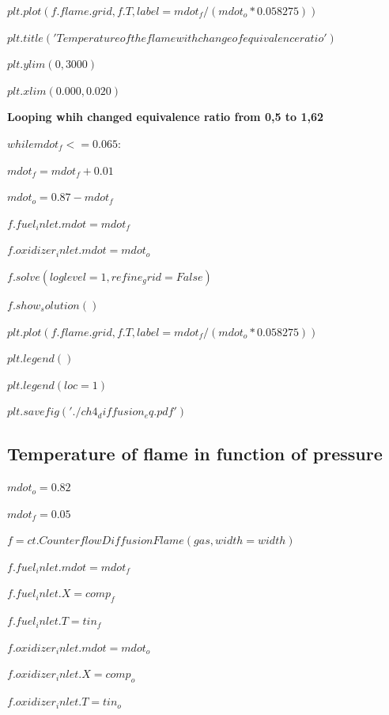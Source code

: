 \documentclass[a4paper]{article}
\begin{document}
$plt.plot(f.flame.grid, f.T, label=mdot_f/(mdot_o*0.058275) )$

$plt.title('Temperature of the flame with change of equivalence ratio')$

$plt.ylim(0,3000)$

$plt.xlim(0.000, 0.020)$

\textbf{Looping whih changed equivalence ratio from 0,5 to 1,62}

$while mdot_f <= 0.065:$

\hspace{5,35mm}$    mdot_f=mdot_f+0.01$

\hspace{5,35mm}$    mdot_o = 0.87-mdot_f$

\hspace{5,35mm}$    f.fuel_inlet.mdot = mdot_f$

\hspace{5,35mm}$    f.oxidizer_inlet.mdot = mdot_o$

\hspace{5,35mm}$    f.solve(loglevel=1, refine_grid=False)$

\hspace{5,35mm}$    f.show_solution()$

\hspace{5,35mm}$    plt.plot(f.flame.grid, f.T, label=mdot_f/(mdot_o*0.058275))$

\hspace{5,35mm}$    plt.legend()$

\hspace{5,35mm}$    plt.legend(loc=1)$

$plt.savefig('./ch4_diffusion_eq.pdf')$

\subsection{Temperature of flame in function of pressure}

$mdot_o = 0.82$

$mdot_f = 0.05$

$f = ct.CounterflowDiffusionFlame(gas, width=width)$

$f.fuel_inlet.mdot = mdot_f$

$f.fuel_inlet.X = comp_f$

$f.fuel_inlet.T = tin_f$

$f.oxidizer_inlet.mdot = mdot_o$

$f.oxidizer_inlet.X = comp_o$

$f.oxidizer_inlet.T = tin_o$
\end{document}

